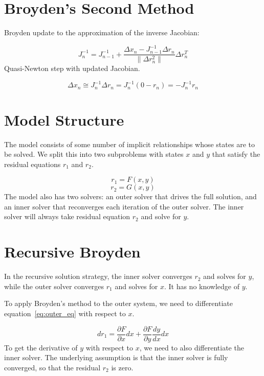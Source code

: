 \documentclass{article}
\begin{document}
\section{Broyden's Second Method}

Broyden update to the approximation of the inverse Jacobian:

\begin{equation}
  J_n^{-1} = J_{n-1}^{-1} + \frac{\Delta x_n - J_{n-1}^{-1} \Delta r_n}{\| \Delta r_{n}^2 \|} \Delta r_{n}^T   \label{eq:broyden}
\end{equation}
Quasi-Newton step with updated Jacobian.

\begin{equation}
  \Delta x_n \cong J_n^{-1} \Delta r_n = J_n^{-1} (0 - r_n) = -J_n^{-1} r_n  \label{eq:newton_update}
\end{equation}

\section{Model Structure}

The model consists of some number of implicit relationships whose states are to be solved. We split this into two subproblems with
states $x$ and $y$ that satisfy the residual equations $r_1$ and $r_2$.

\begin{equation}
  r_1 = F(x, y)  \label{eq:outer_eq}
\end{equation}
\begin{equation}
  r_2 = G(x, y)  \label{eq:inner_eq}
\end{equation}
The model also has two solvers: an outer solver that drives the full solution, and an inner solver that reconverges each
iteration of the outer solver. The inner solver will always take residual equation $r_2$ and solve for $y$.

\section{Recursive Broyden}

In the recursive solution strategy, the inner solver converges $r_2$ and solves for $y$, while the outer solver converges
$r_1$ and solves for $x$.  It has no knowledge of $y$.

To apply Broyden's method to the outer system, we need to differentiate equation~\eqref{eq:outer_eq} with respect to $x$.

\begin{equation}
  dr_1 = \frac{\partial F}{\partial x} dx + \frac{\partial F}{\partial y} \frac{dy}{dx} dx  \label{eq:deriv_outer}
\end{equation}
To get the derivative of $y$ with respect to $x$, we need to also differentiate the inner solver. The underlying assumption is that the
inner solver is fully converged, so that the residual $r_2$ is zero.
\end{document}
